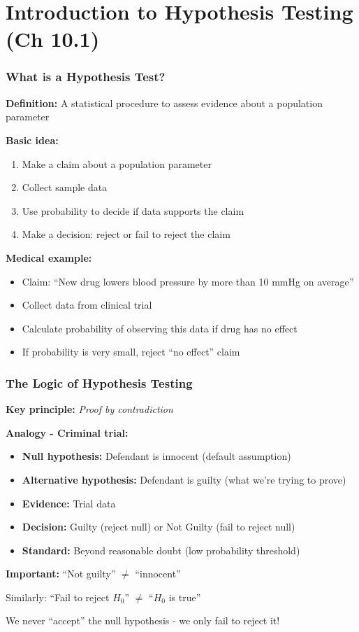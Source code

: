 \documentclass{beamer}
\begin{document}
\section{Introduction to Hypothesis Testing (Ch 10.1)}

\begin{frame}
\frametitle{What is a Hypothesis Test?}
\textbf{Definition:} A statistical procedure to assess evidence about a population parameter

\vspace{0.5cm}
\textbf{Basic idea:}
\begin{enumerate}
\item Make a claim about a population parameter
\item Collect sample data
\item Use probability to decide if data supports the claim
\item Make a decision: reject or fail to reject the claim
\end{enumerate}

\vspace{0.5cm}
\textbf{Medical example:}
\begin{itemize}
\item Claim: ``New drug lowers blood pressure by more than 10 mmHg on average''
\item Collect data from clinical trial
\item Calculate probability of observing this data if drug has no effect
\item If probability is very small, reject ``no effect'' claim
\end{itemize}
\end{frame}

\begin{frame}
\frametitle{The Logic of Hypothesis Testing}
\textbf{Key principle:} \textit{Proof by contradiction}

\vspace{0.5cm}
\textbf{Analogy - Criminal trial:}
\begin{itemize}
\item \textbf{Null hypothesis:} Defendant is innocent (default assumption)
\item \textbf{Alternative hypothesis:} Defendant is guilty (what we're trying to prove)
\item \textbf{Evidence:} Trial data
\item \textbf{Decision:} Guilty (reject null) or Not Guilty (fail to reject null)
\item \textbf{Standard:} Beyond reasonable doubt (low probability threshold)
\end{itemize}

\vspace{0.5cm}
\textbf{Important:} ``Not guilty'' $\neq$ ``innocent''

Similarly: ``Fail to reject $H_0$'' $\neq$ ``$H_0$ is true''

\vspace{0.3cm}
We never ``accept'' the null hypothesis - we only fail to reject it!
\end{frame}
\end{document}
